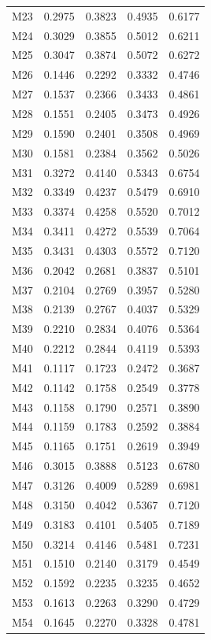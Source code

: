 \begin{longtable}{lrrrr}
M23 & 0.2975 & 0.3823 & 0.4935 & 0.6177 \\
M24 & 0.3029 & 0.3855 & 0.5012 & 0.6211 \\
M25 & 0.3047 & 0.3874 & 0.5072 & 0.6272 \\
M26 & 0.1446 & 0.2292 & 0.3332 & 0.4746 \\
M27 & 0.1537 & 0.2366 & 0.3433 & 0.4861 \\
M28 & 0.1551 & 0.2405 & 0.3473 & 0.4926 \\
M29 & 0.1590 & 0.2401 & 0.3508 & 0.4969 \\
M30 & 0.1581 & 0.2384 & 0.3562 & 0.5026 \\
M31 & 0.3272 & 0.4140 & 0.5343 & 0.6754 \\
M32 & 0.3349 & 0.4237 & 0.5479 & 0.6910 \\
M33 & 0.3374 & 0.4258 & 0.5520 & 0.7012 \\
M34 & 0.3411 & 0.4272 & 0.5539 & 0.7064 \\
M35 & 0.3431 & 0.4303 & 0.5572 & 0.7120 \\
M36 & 0.2042 & 0.2681 & 0.3837 & 0.5101 \\
M37 & 0.2104 & 0.2769 & 0.3957 & 0.5280 \\
M38 & 0.2139 & 0.2767 & 0.4037 & 0.5329 \\
M39 & 0.2210 & 0.2834 & 0.4076 & 0.5364 \\
M40 & 0.2212 & 0.2844 & 0.4119 & 0.5393 \\
M41 & 0.1117 & 0.1723 & 0.2472 & 0.3687 \\
M42 & 0.1142 & 0.1758 & 0.2549 & 0.3778 \\
M43 & 0.1158 & 0.1790 & 0.2571 & 0.3890 \\
M44 & 0.1159 & 0.1783 & 0.2592 & 0.3884 \\
M45 & 0.1165 & 0.1751 & 0.2619 & 0.3949 \\
M46 & 0.3015 & 0.3888 & 0.5123 & 0.6780 \\
M47 & 0.3126 & 0.4009 & 0.5289 & 0.6981 \\
M48 & 0.3150 & 0.4042 & 0.5367 & 0.7120 \\
M49 & 0.3183 & 0.4101 & 0.5405 & 0.7189 \\
M50 & 0.3214 & 0.4146 & 0.5481 & 0.7231 \\
M51 & 0.1510 & 0.2140 & 0.3179 & 0.4549 \\
M52 & 0.1592 & 0.2235 & 0.3235 & 0.4652 \\
M53 & 0.1613 & 0.2263 & 0.3290 & 0.4729 \\
M54 & 0.1645 & 0.2270 & 0.3328 & 0.4781 \\

\end{longtable}
